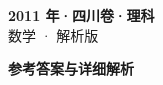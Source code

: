 \documentclass[zihao=-4, a4paper]{ctexart}
\begin{document}
\begin{center}
  {\Large\bfseries 2011 年·四川卷·理科}\\[4pt]
  {\large 数学 · 解析版}
\end{center}
\medskip
{}

\clearpage
{}
\begin{center}{\Large\bfseries 参考答案与详细解析}\end{center}
\medskip

\end{document}

